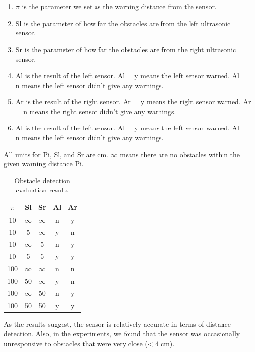 \begin{enumerate}
  \item $\pi$ is the parameter we set as the warning distance from the sensor.
  \item Sl is the parameter of how far the obstacles are from the left ultrasonic sensor.
  \item Sr is the parameter of how far the obstacles are from the right ultrasonic sensor.
  \item Al is the result of the left sensor. Al = y means the left sensor warned. Al = n means the left sensor didn’t give any warnings.
  \item Ar is the result of the right sensor. Ar = y means the right sensor warned. Ar = n means the right sensor didn’t give any warnings.
  \item Al is the result of the left sensor. Al = y means the left sensor warned. Al = n means the left sensor didn’t give any warnings.
\end{enumerate}

All units for Pi, Sl, and Sr are cm. $\infty$ means there are no obstacles within the given warning distance Pi.

\begin{table}
  \caption{Obstacle detection evaluation results}
  \label{tab:freq}
  \begin{tabular}{ccccc}
    \toprule
    $\pi$ & Sl & Sr & Al & Ar \\
    \midrule
    10 & $\infty$ & $\infty$ & n & y  \\
    10 & 5 & $\infty$ & y & n  \\
    10 & $\infty$ & 5 & n & y  \\
    10 & 5 & 5 & y & y  \\
    100 & $\infty$ & $\infty$ & n & n  \\
    100 & 50 & $\infty$ & y & n  \\
    100 & $\infty$ & 50 & n & y  \\
    100 & 50 & 50 & y & y  \\
  \bottomrule
\end{tabular}
\end{table}

As the results suggest, the sensor is relatively accurate in terms of distance detection. Also, in the experiments, we found that the sensor was occasionally unresponsive to obstacles that were very close (< 4 cm).

